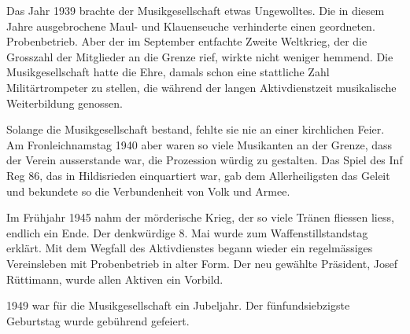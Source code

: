 \begin{multicols}{2}
    Das Jahr 1939 brachte der Musikgesellschaft etwas Ungewolltes. Die in diesem
    Jahre ausgebrochene Maul- und Klauenseuche verhinderte einen geordneten.
    Probenbetrieb. Aber der im September entfachte Zweite Weltkrieg, der die
    Grosszahl der Mitglieder an die Grenze rief, wirkte nicht weniger hemmend.
    Die Musikgesellschaft hatte die Ehre, damals schon eine stattliche Zahl
    Militärtrompeter zu stellen, die während der langen Aktivdienstzeit
    musikalische Weiterbildung genossen.

    Solange die Musikgesellschaft bestand, fehlte sie nie an einer kirchlichen
    Feier. Am Fronleichnamstag 1940 aber waren so viele Musikanten an der
    Grenze, dass der Verein ausserstande war, die Prozession würdig zu
    gestalten. Das Spiel des Inf Reg 86, das in Hildisrieden einquartiert war,
    gab dem Allerheiligsten das Geleit und bekundete so die Verbundenheit von
    Volk und Armee.

    Im Frühjahr 1945 nahm der mörderische Krieg, der so viele Tränen fliessen
    liess, endlich ein Ende. Der denkwürdige 8. Mai wurde zum
    Waffenstillstandstag erklärt. Mit dem Wegfall des Aktivdienstes begann
    wieder ein regelmässiges Vereinsleben mit Probenbetrieb in alter Form. Der
    neu gewählte Präsident, Josef Rüttimann, wurde allen Aktiven ein Vorbild.

    1949 war für die Musikgesellschaft ein Jubeljahr. Der fünfundsiebzigste
    Geburtstag wurde gebührend gefeiert.


\end{multicols}
